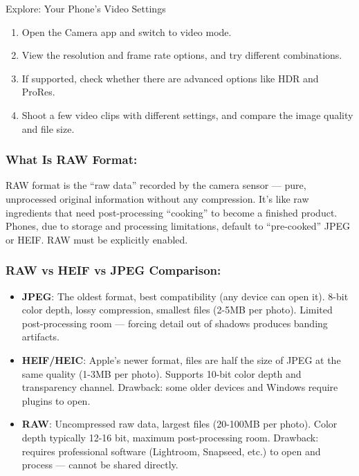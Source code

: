 \begin{tcbpractice}{Explore: Your Phone's Video Settings}
\begin{enumerate}
  \item Open the Camera app and switch to video mode.
  \item View the resolution and frame rate options, and try different combinations.
  \item If supported, check whether there are advanced options like HDR and ProRes.
  \item Shoot a few video clips with different settings, and compare the image quality and file size.
\end{enumerate}

\end{tcbpractice}


\subsubsection*{What Is RAW Format:}

RAW format is the “raw data” recorded by the camera sensor — pure, unprocessed original information without any compression. It's like raw ingredients that need post-processing “cooking” to become a finished product. Phones, due to storage and processing limitations, default to “pre-cooked” JPEG or HEIF. RAW must be explicitly enabled.

\subsubsection*{RAW vs HEIF vs JPEG Comparison:}

\begin{itemize}
  \item \textbf{JPEG}: The oldest format, best compatibility (any device can open it). 8-bit color depth, lossy compression, smallest files (2-5MB per photo). Limited post-processing room — forcing detail out of shadows produces banding artifacts.
  \item \textbf{HEIF/HEIC}: Apple's newer format, files are half the size of JPEG at the same quality (1-3MB per photo). Supports 10-bit color depth and transparency channel. Drawback: some older devices and Windows require plugins to open.
  \item \textbf{RAW}: Uncompressed raw data, largest files (20-100MB per photo). Color depth typically 12-16 bit, maximum post-processing room. Drawback: requires professional software (Lightroom, Snapseed, etc.) to open and process — cannot be shared directly.
\end{itemize}

